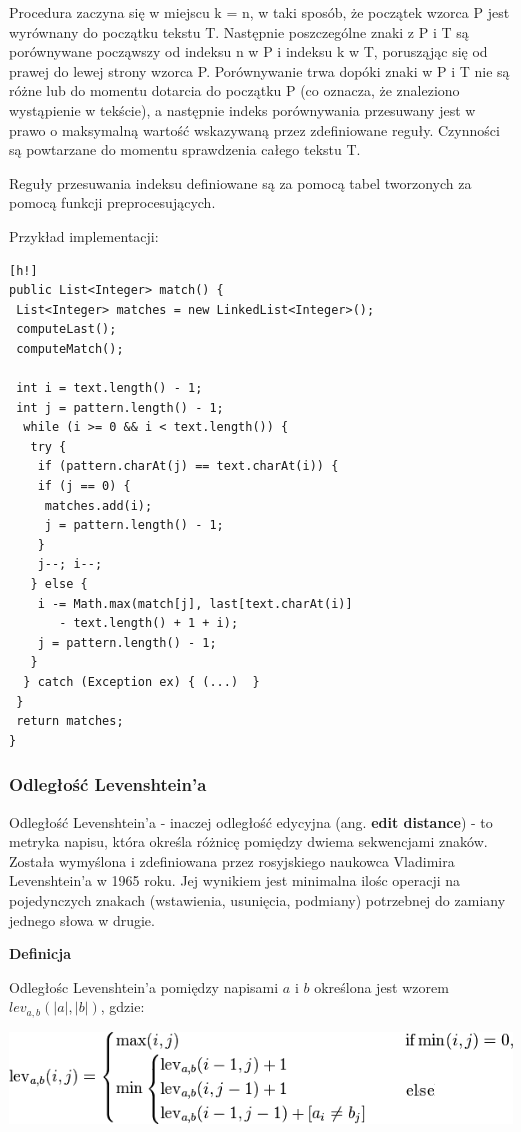 \documentclass[a4paper,12pt]{article}
\begin{document}
Procedura zaczyna się w miejscu k = n, w taki sposób, że początek wzorca P jest wyrównany do początku tekstu T. Następnie poszczególne znaki z P i T są porównywane począwszy od indeksu n w P i indeksu k w T, porusząjąc się od prawej do lewej strony wzorca P. Porównywanie trwa dopóki znaki w P i T nie są różne lub do momentu dotarcia do początku P (co oznacza, że znaleziono wystąpienie w tekście), a następnie indeks porównywania przesuwany jest w prawo o maksymalną wartość wskazywaną przez zdefiniowane reguły. Czynności są powtarzane do momentu sprawdzenia całego tekstu T.

Reguły przesuwania indeksu definiowane są za pomocą tabel tworzonych za pomocą funkcji preprocesujących.

\pagebreak

Przykład implementacji:
\begin{lstlisting}[h!]
public List<Integer> match() {
 List<Integer> matches = new LinkedList<Integer>();
 computeLast();
 computeMatch();

 int i = text.length() - 1;
 int j = pattern.length() - 1;
  while (i >= 0 && i < text.length()) {
   try {
    if (pattern.charAt(j) == text.charAt(i)) {
	if (j == 0) {
	 matches.add(i);
	 j = pattern.length() - 1;
    }
	j--; i--;
   } else {
    i -= Math.max(match[j], last[text.charAt(i)] 
       - text.length() + 1 + i);
    j = pattern.length() - 1;
   }
  } catch (Exception ex) { (...)  }
 }
 return matches;
}
\end{lstlisting}

\newpage

\subsubsection{Odległość Levenshtein'a}

Odległość Levenshtein'a - inaczej odległość edycyjna (ang. \textbf{edit distance}) - to metryka napisu, która określa różnicę pomiędzy dwiema sekwencjami znaków. Została wymyślona i zdefiniowana przez rosyjskiego naukowca Vladimira Levenshtein'a w 1965 roku.
Jej wynikiem jest minimalna ilośc operacji na pojedynczych znakach (wstawienia, usunięcia, podmiany) potrzebnej do zamiany jednego słowa w drugie.

\textbf{Definicja}

Odległośc Levenshtein'a pomiędzy napisami $a$ i $b$ określona jest wzorem $lev_{a,b}(|a|,|b|)$, gdzie:
\begin{center}
\includegraphics[scale=0.7]{gfx/levenshtein_def.png}
\end{center}
\end{document}

